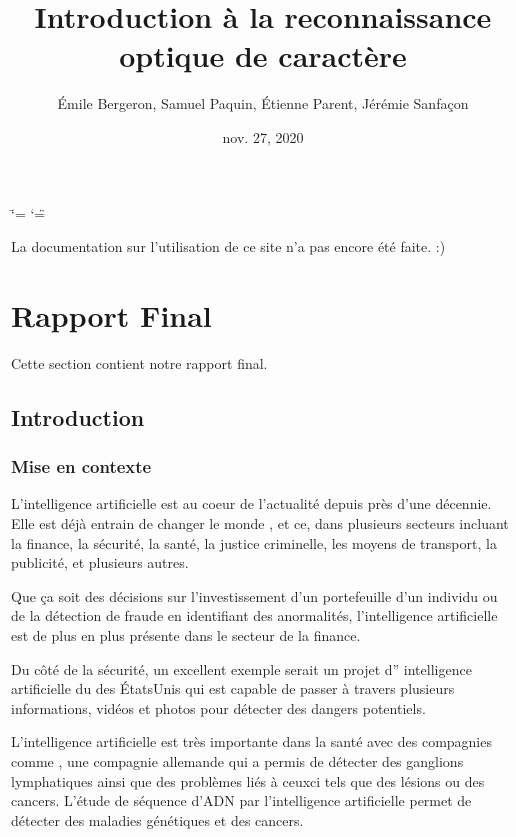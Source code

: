 \documentclass[letterpaper,10pt,french]{sphinxmanual}
\title{Introduction à la reconnaissance optique de caractère}
\date{nov. 27, 2020}
\author{Émile Bergeron, Samuel Paquin, Étienne Parent, Jérémie Sanfaçon}
\begin{document}
\ifdefined\shorthandoff
  \ifnum\catcode`\=\string=\active\shorthandoff{=}\fi
  \ifnum\catcode`\"=\active{}\fi
\fi

\pagestyle{empty}
\sphinxmaketitle
\pagestyle{plain}
\sphinxtableofcontents
\pagestyle{normal}
\label{\detokenize{intro::doc}}


La documentation sur l’utilisation de ce site n’a pas encore été faite. :)


\chapter{Rapport Final}
\label{\detokenize{rapport_final:rapport-final}}\label{\detokenize{rapport_final::doc}}
Cette section contient notre rapport final.


\section{Introduction}
\label{\detokenize{intro_finale:introduction}}\label{\detokenize{intro_finale::doc}}

\subsection{Mise en contexte}
\label{\detokenize{intro_finale:mise-en-contexte}}
L’intelligence artificielle est au coeur de l’actualité depuis près d’une
décennie. Elle est déjà entrain de changer le monde , et ce, dans plusieurs
secteurs incluant la finance, la sécurité, la santé, la justice criminelle,
les moyens de transport, la publicité, et plusieurs autres.

Que ça soit des décisions sur l’investissement d’un portefeuille
d’un individu ou de la détection de fraude en identifiant des anormalités, l’intelligence
artificielle est de plus en plus présente dans le secteur de la finance. 

Du côté de la
sécurité, un excellent exemple serait 
un projet d” intelligence artificielle du 
des États\sphinxhyphen{}Unis qui est capable de passer à travers plusieurs informations,
vidéos et photos pour détecter des dangers potentiels.

L’intelligence artificielle est très importante dans la santé avec des compagnies comme
, une compagnie allemande qui a permis de détecter
des ganglions lymphatiques ainsi que des problèmes liés à ceux\sphinxhyphen{}ci tels que des lésions
ou des cancers. L’étude de séquence d’ADN par l’intelligence artificielle permet de détecter
des maladies génétiques et des cancers.
\end{document}
